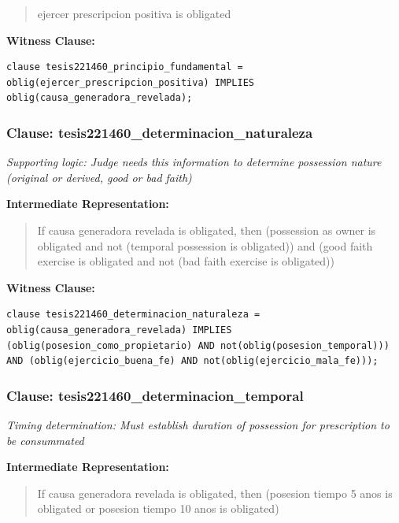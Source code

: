 \documentclass[11pt,a4paper]{article}
\begin{document}
\begin{quote}
ejercer prescripcion positiva is obligated
\end{quote}

\textbf{Witness Clause:}

\begin{lstlisting}[style=witnessstyle, language=Witness]
clause tesis221460_principio_fundamental = oblig(ejercer_prescripcion_positiva) IMPLIES oblig(causa_generadora_revelada);
\end{lstlisting}

\subsubsection{Clause: tesis221460\_determinacion\_naturaleza}

\textit{Supporting logic: Judge needs this information to determine possession nature (original or derived, good or bad faith)}

\textbf{Intermediate Representation:}

\begin{quote}
If causa generadora revelada is obligated, then (possession as owner is obligated and not (temporal possession is obligated)) and (good faith exercise is obligated and not (bad faith exercise is obligated))
\end{quote}

\textbf{Witness Clause:}

\begin{lstlisting}[style=witnessstyle, language=Witness]
clause tesis221460_determinacion_naturaleza = oblig(causa_generadora_revelada) IMPLIES (oblig(posesion_como_propietario) AND not(oblig(posesion_temporal))) AND (oblig(ejercicio_buena_fe) AND not(oblig(ejercicio_mala_fe)));
\end{lstlisting}

\subsubsection{Clause: tesis221460\_determinacion\_temporal}

\textit{Timing determination: Must establish duration of possession for prescription to be consummated}

\textbf{Intermediate Representation:}

\begin{quote}
If causa generadora revelada is obligated, then (posesion tiempo 5 anos is obligated or posesion tiempo 10 anos is obligated)
\end{quote}
\end{document}
